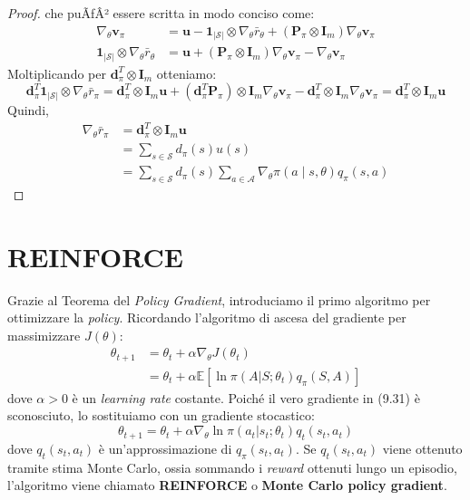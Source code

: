 ﻿\documentclass[11pt, a4paper]{report}
\begin{document}
\begin{proof}
che puÃƒÂ² essere scritta in modo conciso come:
\begin{align*}
\nabla_{\theta} \bm{v}_{\pi} &= \bm{u} - \bm{1}_{|\mathcal{S}|} \otimes \nabla_{\theta} \bar{r}_{\theta} + (\bm{P}_{\pi} \otimes \bm{I}_m) \nabla_{\theta} \bm{v}_{\pi} \\
\bm{1}_{|\mathcal{S}|} \otimes \nabla_{\theta} \bar{r}_{\theta} &= \bm{u} + (\bm{P}_{\pi} \otimes \bm{I}_m) \nabla_{\theta} \bm{v}_{\pi} - \nabla_{\theta} \bm{v}_{\pi}
\end{align*}
Moltiplicando per $\bm{d}_{\pi}^T \otimes \bm{I}_m$ otteniamo:
\begin{equation}
\bm{d}_{\pi}^T \bm{1}_{|\mathcal{S}|} \otimes \nabla_{\theta} \bar{r}_{\pi} = \bm{d}_{\pi}^T \otimes \bm{I}_m \bm{u} + (\bm{d}_{\pi}^T \bm{P}_{\pi}) \otimes \bm{I}_m \nabla_{\theta} \bm{v}_{\pi} - \bm{d}_{\pi}^T \otimes \bm{I}_m \nabla_{\theta} \bm{v}_{\pi} = \bm{d}_{\pi}^T \otimes \bm{I}_m \bm{u}
\end{equation}
Quindi,
\begin{align*}
\nabla_{\theta} \bar{r}_{\pi} &= \bm{d}_{\pi}^T \otimes \bm{I}_m \bm{u} \\
&= \sum_{s \in \mathcal{S}} d_{\pi}(s) u(s) \\
&= \sum_{s \in \mathcal{S}} d_{\pi}(s) \sum_{a \in \mathcal{A}} \nabla_{\theta} \pi(a \mid s, \theta) q_{\pi}(s, a)
\end{align*}
\end{proof}

\chapter{REINFORCE}

Grazie al Teorema del \emph{Policy Gradient}, introduciamo il primo algoritmo per ottimizzare la \emph{policy}. Ricordando l'algoritmo di ascesa del gradiente per massimizzare $J(\theta)$:
\begin{align}
\theta_{t+1} &= \theta_t + \alpha\nabla_\theta J(\theta_t) \label{eq:9.1} \\
&= \theta_t + \alpha \mathbb{E} \left[ \ln \pi(A|S; \theta_t)q_\pi(S, A) \right] \label{eq:9.2}
\end{align}
dove $\alpha > 0$ è un \emph{learning rate} costante. Poiché il vero gradiente in (9.31) è sconosciuto, lo sostituiamo con un gradiente stocastico:
\begin{equation}
\theta_{t+1} = \theta_t + \alpha\nabla_\theta \ln \pi(a_t | s_t; \theta_t) q_t(s_t, a_t) \label{eq:9.3}
\end{equation}
dove $q_t(s_t, a_t)$ è un'approssimazione di $q_\pi(s_t, a_t)$. Se $q_t(s_t, a_t)$ viene ottenuto tramite stima Monte Carlo, ossia sommando i \emph{reward} ottenuti lungo un episodio, l'algoritmo viene chiamato \textbf{REINFORCE} o \textbf{Monte Carlo policy gradient}.
\end{document}
